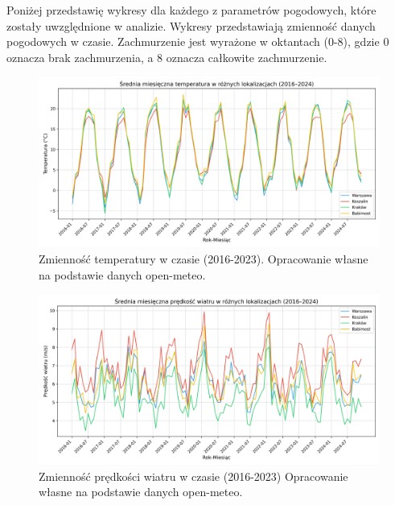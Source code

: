 Poniżej przedstawię wykresy dla każdego z parametrów pogodowych, które zostały uwzględnione w analizie. Wykresy przedstawiają zmienność danych pogodowych w czasie. Zachmurzenie jest wyrażone w oktantach (0-8), gdzie 0 oznacza brak zachmurzenia, a 8 oznacza całkowite zachmurzenie.

\begin{figure}[H]
    \centering
    \includegraphics[width=\textwidth]{../plots/weather/temp_time_series_full.png}
    \caption{Zmienność temperatury w czasie (2016-2023). Opracowanie własne na podstawie danych open-meteo.}
    \label{fig:temp-time-series-full}
\end{figure}

\begin{figure}[H]
    \centering
    \includegraphics[width=\textwidth]{../plots/weather/wind_speed_time_series_full.png}
    \caption{Zmienność prędkości wiatru w czasie (2016-2023) Opracowanie własne na podstawie danych open-meteo.}
    \label{fig:wind-speed-time-series-full}
\end{figure}

